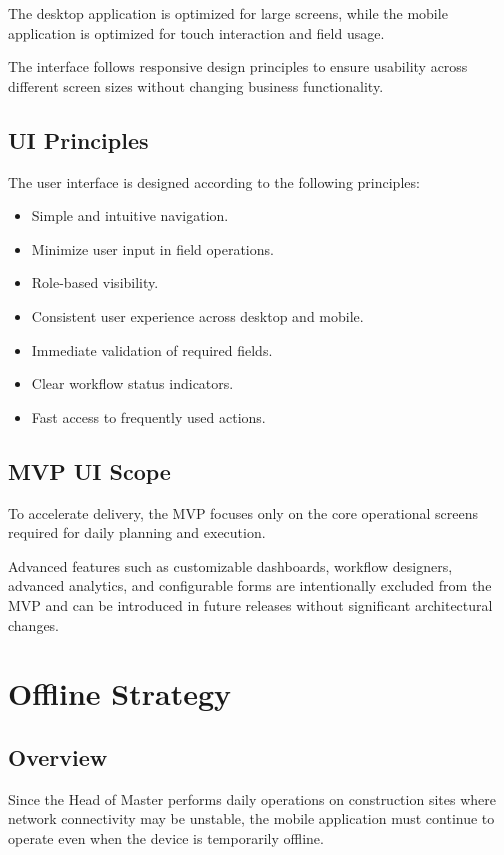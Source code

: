 \documentclass[11pt]{article}
\begin{document}
The desktop application is optimized for large screens, while the mobile
application is optimized for touch interaction and field usage.

The interface follows responsive design principles to ensure usability across
different screen sizes without changing business functionality.

\subsection{UI Principles}

The user interface is designed according to the following principles:

\begin{itemize}
    \item Simple and intuitive navigation.
    \item Minimize user input in field operations.
    \item Role-based visibility.
    \item Consistent user experience across desktop and mobile.
    \item Immediate validation of required fields.
    \item Clear workflow status indicators.
    \item Fast access to frequently used actions.
\end{itemize}

\subsection{MVP UI Scope}

To accelerate delivery, the MVP focuses only on the core operational screens
required for daily planning and execution.

Advanced features such as customizable dashboards, workflow designers,
advanced analytics, and configurable forms are intentionally excluded from the
MVP and can be introduced in future releases without significant architectural
changes.

\clearpage
\section{Offline Strategy}

\subsection{Overview}

Since the Head of Master performs daily operations on construction sites where
network connectivity may be unstable, the mobile application must continue to
operate even when the device is temporarily offline.
\end{document}
